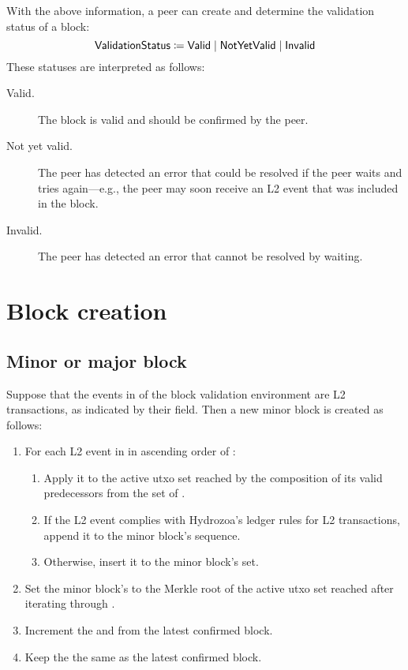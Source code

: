 \documentclass[../hydrozoa.tex]{subfiles}
\begin{document}
With the above information, a peer can create and determine the validation status of a block:
\begin{equation*}
  \mathsf{ValidationStatus} \coloneq
    \mathsf{Valid} \mid
    \mathsf{NotYetValid} \mid
    \mathsf{Invalid}
\end{equation*}
These statuses are interpreted as follows:
\begin{description}
  \item[Valid.] The block is valid and should be confirmed by the peer.
  \item[Not yet valid.] The peer has detected an error that could be resolved if the peer waits and tries again---e.g., the peer may soon receive an L2 event that was included in the block.
  \item[Invalid.] The peer has detected an error that cannot be resolved by waiting.
\end{description}

\section{Block creation}%
\label{h:l2-block-creation}%


\subsection{Minor or major block}%
\label{h:l2-block-creation-minor-major}%

Suppose that the events in  of the block validation environment are L2 transactions, as indicated by their  field.
Then a new minor block is created as follows:
\begin{enumerate}
  \item For each L2 event in  in ascending order of :
      \begin{enumerate}
        \item Apply it to the active utxo set reached by the composition of its valid predecessors from the  set of .
        \item If the L2 event complies with Hydrozoa's ledger rules for L2 transactions, append it to the minor block's  sequence.
        \item Otherwise, insert it to the minor block's  set.
      \end{enumerate}
  \item Set the minor block's  to the Merkle root of the active utxo set reached after iterating through .
  \item Increment the  and  from the latest confirmed block.
  \item Keep the  the same as the latest confirmed block.
\end{enumerate}
\end{document}
